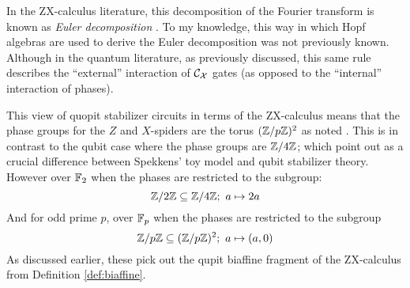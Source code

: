 %
%
%
%
In the ZX-calculus literature, this decomposition of the Fourier transform is known as {\it Euler decomposition} \cite{duncan2009graph}.  To my knowledge, this way in which Hopf algebras are used to derive the Euler decomposition was not previously known.  Although in the quantum literature, as previously discussed, this same rule describes the ``external'' interaction of ${\cal C}_{\cal X}$ gates (as opposed to the ``internal'' interaction of phases).


This view of quopit stabilizer circuits in terms of the ZX-calculus means that the phase groups for the $Z$ and $X$-spiders are the torus $(\mathbb{Z}/p\mathbb{Z})^2$  as noted \cite[Page 166]{ranchin2016alternative}.  This is in contrast to the qubit case where the phase groups are $\mathbb{Z}/4\mathbb{Z}$; which \cite{coecke2011phase} point out as a crucial difference between Spekkens' toy model and qubit stabilizer theory.
However over $\mathbb{F}_2$ when the phases are restricted to the subgroup:
$$\Z/2\Z\subseteq \Z/4\Z; \ a\mapsto 2a$$
And for odd prime $p$, over $\mathbb{F}_p$ when the phases are restricted to the subgroup
$$\mathbb{Z}/p\mathbb{Z} \subseteq (\mathbb{Z}/p\mathbb{Z})^2; \ a\mapsto (a,0)$$
As discussed earlier, these pick out the qupit biaffine fragment of the  ZX-calculus from Definition \ref{def:biaffine}.


